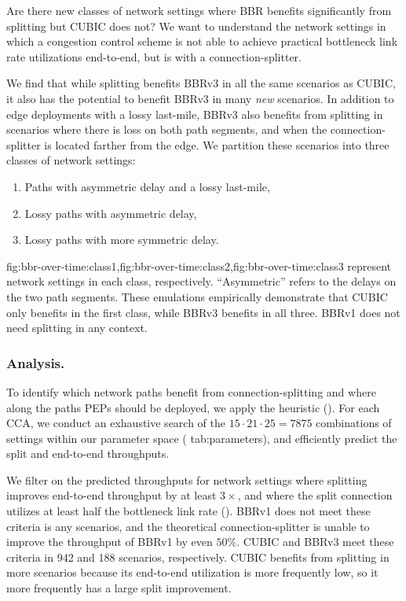
Are there new classes of network settings where BBR benefits significantly from
splitting but CUBIC does not? We want to understand the network settings in
which a congestion control scheme is not able to achieve practical bottleneck
link rate utilizations end-to-end, but is with a connection-splitter.

We find that while splitting benefits BBRv3 in all the same scenarios as CUBIC,
it also has the potential to benefit BBRv3 in many \textit{new} scenarios.
In addition to edge deployments with a lossy last-mile, BBRv3
also benefits from splitting in scenarios where there is loss on both path
segments, and when the connection-splitter is located farther from the edge.
We partition these scenarios into three classes of network settings:

\begin{enumerate}[label=\Roman*.,noitemsep]
\item Paths with asymmetric delay and a lossy last-mile,
\item Lossy paths with asymmetric delay,
\item Lossy paths with more symmetric delay.
\end{enumerate}

\noindent \Cref
 {fig:bbr-over-time:class1,fig:bbr-over-time:class2,fig:bbr-over-time:class3}
represent network settings in each class, respectively.
``Asymmetric'' refers to the delays on the two path segments.
These emulations empirically demonstrate that CUBIC only benefits in the first
class, while BBRv3 benefits in all three.
BBRv1 does not need splitting in any context.

\subsubsection{Analysis.}
To identify which network paths benefit from connection-splitting and where
along the paths PEPs should be deployed, we apply the
heuristic ().
For each CCA, we conduct an exhaustive search of the $15 \cdot 21 \cdot 25 =
7875$ combinations of settings within our parameter space (\Cref
{tab:parameters}), and efficiently predict the split and end-to-end throughputs.

We filter on the predicted throughputs for network settings where splitting improves end-to-end throughput by
at least $3\times$, and where the split connection utilizes at least half the
bottleneck link rate (). BBRv1 does not meet
these criteria is any scenarios, and the theoretical connection-splitter is
unable to improve the throughput of BBRv1 by even $50\%$. CUBIC and BBRv3 meet
these criteria in 942 and 188 scenarios, respectively. CUBIC benefits from
splitting in more scenarios because its end-to-end utilization is more
frequently low, so it more frequently has a large split improvement.

